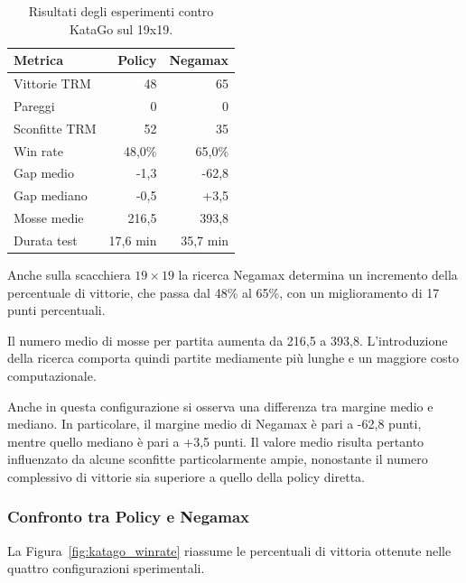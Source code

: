 \begin{table}[htbp]
    \centering
    \caption{Risultati degli esperimenti contro KataGo sul 19x19.}
    \label{tab:katago_19x19}
    \begin{tabular}{lrr}
        \hline
        \textbf{Metrica} & \textbf{Policy} & \textbf{Negamax} \\
        \hline
        Vittorie TRM     & 48              & 65               \\
        Pareggi          & 0               & 0                \\
        Sconfitte TRM    & 52              & 35               \\
        Win rate         & 48,0\%          & 65,0\%           \\
        Gap medio        & -1,3            & -62,8            \\
        Gap mediano      & -0,5            & +3,5             \\
        Mosse medie      & 216,5           & 393,8            \\
        Durata test      & 17,6 min        & 35,7 min         \\
        \hline
    \end{tabular}
\end{table}

Anche sulla scacchiera $19 \times 19$ la ricerca Negamax determina un incremento della percentuale di vittorie, che passa dal 48\% al 65\%, con un miglioramento di 17 punti percentuali.

Il numero medio di mosse per partita aumenta da 216,5 a 393,8. L'introduzione della ricerca comporta quindi partite mediamente più lunghe e un maggiore costo computazionale.

Anche in questa configurazione si osserva una differenza tra margine medio e mediano. In particolare, il margine medio di Negamax è pari a -62,8 punti, mentre quello mediano è pari a +3,5 punti. Il valore medio risulta pertanto influenzato da alcune sconfitte particolarmente ampie, nonostante il numero complessivo di vittorie sia superiore a quello della policy diretta.

\subsubsection{Confronto tra Policy e Negamax}

La Figura~\ref{fig:katago_winrate} riassume le percentuali di vittoria ottenute nelle quattro configurazioni sperimentali.

